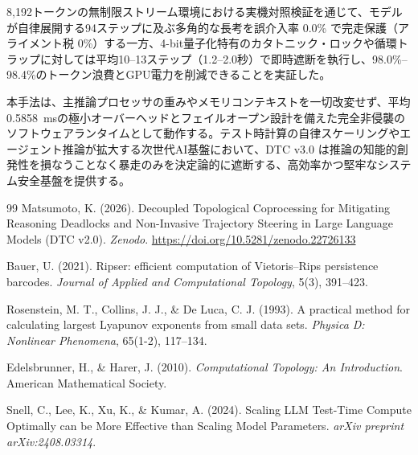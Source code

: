 \documentclass[11pt,a4paper]{article}
\begin{document}
8,192トークンの無制限ストリーム環境における実機対照検証を通じて、モデルが自律展開する94ステップに及ぶ多角的な長考を誤介入率 0.0\% で完走保護（アライメント税 0\%）する一方、4-bit量子化特有のカタトニック・ロックや循環トラップに対しては平均10--13ステップ（1.2--2.0秒）で即時遮断を執行し、98.0\%--98.4\%のトークン浪費とGPU電力を削減できることを実証した。

本手法は、主推論プロセッサの重みやメモリコンテキストを一切改変せず、平均0.5858~msの極小オーバーヘッドとフェイルオープン設計を備えた完全非侵襲のソフトウェアランタイムとして動作する。テスト時計算の自律スケーリングやエージェント推論が拡大する次世代AI基盤において、DTC v3.0 は推論の知能的創発性を損なうことなく暴走のみを決定論的に遮断する、高効率かつ堅牢なシステム安全基盤を提供する。

\begin{thebibliography}{99}
Matsumoto, K. (2026). Decoupled Topological Coprocessing for Mitigating Reasoning Deadlocks and Non-Invasive Trajectory Steering in Large Language Models (DTC v2.0). \textit{Zenodo}. \url{https://doi.org/10.5281/zenodo.22726133}

Bauer, U. (2021). Ripser: efficient computation of Vietoris--Rips persistence barcodes. \textit{Journal of Applied and Computational Topology}, 5(3), 391--423.

Rosenstein, M. T., Collins, J. J., \& De Luca, C. J. (1993). A practical method for calculating largest Lyapunov exponents from small data sets. \textit{Physica D: Nonlinear Phenomena}, 65(1-2), 117--134.

Edelsbrunner, H., \& Harer, J. (2010). \textit{Computational Topology: An Introduction}. American Mathematical Society.

Snell, C., Lee, K., Xu, K., \& Kumar, A. (2024). Scaling LLM Test-Time Compute Optimally can be More Effective than Scaling Model Parameters. \textit{arXiv preprint arXiv:2408.03314}.
\end{thebibliography}
\end{document}
